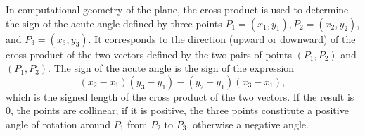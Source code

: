 %	
%	
%	


\fi

\begin{remark}
In computational geometry of the plane, the cross product is used to determine the sign of the acute angle defined by three points $\displaystyle P_{1}=(x_{1},y_{1}),P_{2}=(x_{2},y_{2})$,  and  $P_{3}=(x_{3},y_{3})$. It corresponds to the direction (upward or downward) of the cross product of the two vectors defined by the two pairs of points $(P_{1},P_{2})$  and $(P_{1},P_{3})$. The sign of the acute angle is the sign of the expression
$$
{\displaystyle (x_{2}-x_{1})(y_{3}-y_{1})-(y_{2}-y_{1})(x_{3}-x_{1}),} 
$$
which is the signed length of the cross product of the two vectors. If the result is 0, the points are collinear; if it is positive, the three points constitute a positive angle of rotation around  $P_{1}$ from $P_{2}$ to $P_{3}$, otherwise a negative angle.
\end{remark}

